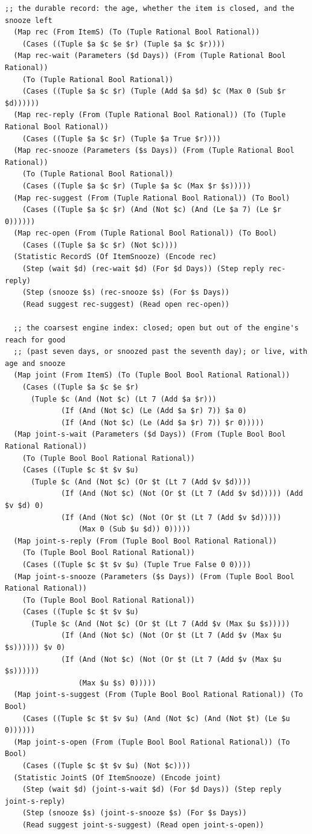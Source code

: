 \documentclass[11pt]{article}
\theoremstyle{definition}
\theoremstyle{plain}
\begin{document}
\begin{lstlisting}[style=mettamod]
  ;; the durable record: the age, whether the item is closed, and the snooze left
  (Map rec (From ItemS) (To (Tuple Rational Bool Rational))
    (Cases ((Tuple $a $c $e $r) (Tuple $a $c $r))))
  (Map rec-wait (Parameters ($d Days)) (From (Tuple Rational Bool Rational))
    (To (Tuple Rational Bool Rational))
    (Cases ((Tuple $a $c $r) (Tuple (Add $a $d) $c (Max 0 (Sub $r $d))))))
  (Map rec-reply (From (Tuple Rational Bool Rational)) (To (Tuple Rational Bool Rational))
    (Cases ((Tuple $a $c $r) (Tuple $a True $r))))
  (Map rec-snooze (Parameters ($s Days)) (From (Tuple Rational Bool Rational))
    (To (Tuple Rational Bool Rational))
    (Cases ((Tuple $a $c $r) (Tuple $a $c (Max $r $s)))))
  (Map rec-suggest (From (Tuple Rational Bool Rational)) (To Bool)
    (Cases ((Tuple $a $c $r) (And (Not $c) (And (Le $a 7) (Le $r 0))))))
  (Map rec-open (From (Tuple Rational Bool Rational)) (To Bool)
    (Cases ((Tuple $a $c $r) (Not $c))))
  (Statistic RecordS (Of ItemSnooze) (Encode rec)
    (Step (wait $d) (rec-wait $d) (For $d Days)) (Step reply rec-reply)
    (Step (snooze $s) (rec-snooze $s) (For $s Days))
    (Read suggest rec-suggest) (Read open rec-open))

  ;; the coarsest engine index: closed; open but out of the engine's reach for good
  ;; (past seven days, or snoozed past the seventh day); or live, with age and snooze
  (Map joint (From ItemS) (To (Tuple Bool Bool Rational Rational))
    (Cases ((Tuple $a $c $e $r)
      (Tuple $c (And (Not $c) (Lt 7 (Add $a $r)))
             (If (And (Not $c) (Le (Add $a $r) 7)) $a 0)
             (If (And (Not $c) (Le (Add $a $r) 7)) $r 0)))))
  (Map joint-s-wait (Parameters ($d Days)) (From (Tuple Bool Bool Rational Rational))
    (To (Tuple Bool Bool Rational Rational))
    (Cases ((Tuple $c $t $v $u)
      (Tuple $c (And (Not $c) (Or $t (Lt 7 (Add $v $d))))
             (If (And (Not $c) (Not (Or $t (Lt 7 (Add $v $d))))) (Add $v $d) 0)
             (If (And (Not $c) (Not (Or $t (Lt 7 (Add $v $d)))))
                 (Max 0 (Sub $u $d)) 0)))))
  (Map joint-s-reply (From (Tuple Bool Bool Rational Rational))
    (To (Tuple Bool Bool Rational Rational))
    (Cases ((Tuple $c $t $v $u) (Tuple True False 0 0))))
  (Map joint-s-snooze (Parameters ($s Days)) (From (Tuple Bool Bool Rational Rational))
    (To (Tuple Bool Bool Rational Rational))
    (Cases ((Tuple $c $t $v $u)
      (Tuple $c (And (Not $c) (Or $t (Lt 7 (Add $v (Max $u $s)))))
             (If (And (Not $c) (Not (Or $t (Lt 7 (Add $v (Max $u $s)))))) $v 0)
             (If (And (Not $c) (Not (Or $t (Lt 7 (Add $v (Max $u $s))))))
                 (Max $u $s) 0)))))
  (Map joint-s-suggest (From (Tuple Bool Bool Rational Rational)) (To Bool)
    (Cases ((Tuple $c $t $v $u) (And (Not $c) (And (Not $t) (Le $u 0))))))
  (Map joint-s-open (From (Tuple Bool Bool Rational Rational)) (To Bool)
    (Cases ((Tuple $c $t $v $u) (Not $c))))
  (Statistic JointS (Of ItemSnooze) (Encode joint)
    (Step (wait $d) (joint-s-wait $d) (For $d Days)) (Step reply joint-s-reply)
    (Step (snooze $s) (joint-s-snooze $s) (For $s Days))
    (Read suggest joint-s-suggest) (Read open joint-s-open))
\end{lstlisting}
\end{document}
